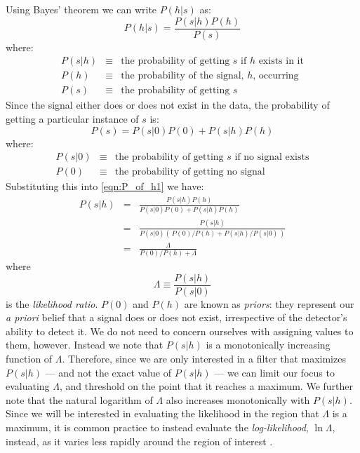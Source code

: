 Using Bayes' theorem \cite{Sivia:DataAnalysis:2E} we can write $P(h|s)$ as:
\begin{equation}
\label{eqn:P_of_h1}
P(h|s) = \frac{P(s|h) P(h)}{P(s)}
\end{equation}
where:
\begin{eqnarray}
P(s|h) & \equiv & \mbox{the probability of getting $s$ if $h$ exists in it} \nonumber \\
P(h)   & \equiv & \mbox{the probability of the signal, $h$, occurring} \nonumber \\
P(s)   & \equiv & \mbox{the probability of getting $s$} \nonumber
\end{eqnarray}
Since the signal either does or does not exist in the data, the probability of getting a particular instance of $s$ is:
\begin{equation}
P(s) = P(s|0)P(0) + P(s|h)P(h)
\end{equation}
where:
\begin{eqnarray}
P(s|0) & \equiv & \mbox{the probability of getting $s$ if no signal exists} \nonumber \\
P(0) & \equiv & \mbox{the probability of getting no signal} \nonumber
\end{eqnarray}
Substituting this into \ref{eqn:P_of_h1} we have:
\begin{eqnarray}
\label{eqn:P_of_h}
P(s|h) & = & \frac{ P(s|h) P(h) }{ P(s|0)P(0) + P(s|h)P(h) } \nonumber \\
 & = & \frac{ P(s|h) } { P(s|0) \left(\, P(0)/P(h) + P(s|h)/P(s|0) \,\right) } \nonumber \\
 & = & \frac{ \Lambda }{ P(0)/P(h) + \Lambda }
\end{eqnarray}
where
\begin{equation}
\label{eqn:likelihood_ratio}
\Lambda \equiv \frac{ P(s|h) }{ P(s|0) }
\end{equation}
is the \emph{likelihood ratio}. $P(0)$ and $P(h)$ are known as \emph{priors}: they represent our \emph{a priori} belief that a signal does or does not exist, irrespective of the detector's ability to detect it. We do not need to concern ourselves with assigning values to them, however. Instead we note that $P(s|h)$ is a monotonically increasing function of $\Lambda$. Therefore, since we are only interested in a filter that maximizes $P(s|h)$ --- and not the exact value of $P(s|h)$ --- we can limit our focus to evaluating $\Lambda$, and threshold on the point that it reaches a maximum. We further note that the natural logarithm of $\Lambda$ also increases monotonically with $P(s|h)$. Since we will be interested in evaluating the likelihood in the region that $\Lambda$ is a maximum, it is common practice to instead evaluate the \emph{log-likelihood}, $\ln \Lambda$, instead, as it varies less rapidly around the region of interest \cite{Sivia:DataAnalysis:2E}.

